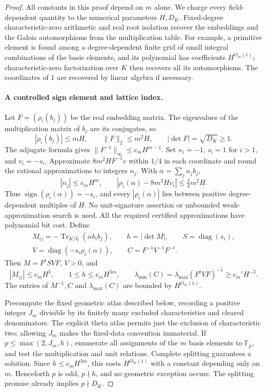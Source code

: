 \documentclass[11pt]{article}
\theoremstyle{definition}
\theoremstyle{remark}
\begin{document}
\begin{proof}

All constants in this proof depend on $m$ alone.  We charge every
field-dependent quantity to the numerical parameters $H,D_K$.  Fixed-degree
characteristic-zero arithmetic and real root isolation recover the embeddings
and the Galois automorphisms from the multiplication table.  For example,
a primitive element is found among a degree-dependent finite grid of small
integral combinations of the basis elements, and its polynomial has
coefficients $H^{O_m(1)}$; characteristic-zero factorization over $K$ then
recovers all its automorphisms.  The coordinates of $1$ are recovered by
linear algebra if necessary.

\paragraph{A controlled sign element and lattice index.}
Let $F=(\rho_i(b_j))$ be the real embedding matrix.  The eigenvalues of the
multiplication matrix of $b_j$ are its conjugates, so
\[
 |\rho_i(b_j)|\leq mH,\qquad \|F\|_2\leq m^2H,
 \qquad |\det F|=\sqrt{D_K}\geq1.
\]
The adjugate formula gives $\|F^{-1}\|_\infty\leq c_mH^{m-1}$.
Set $s_1=-1$, $s_i=1$ for $i>1$, and $v_i=-s_i$.
Approximate $8m^2HF^{-1}v$ within $1/4$ in each coordinate and round the
rational approximations to integers $n_j$.  With $\alpha=\sum_jn_jb_j$,
\[
 |n_j|\leq c_mH^m,\qquad
 |\rho_i(\alpha)-8m^2Hv_i|\leq\tfrac34m^2H.
\]
Thus $\operatorname{sign}(\rho_i(\alpha))=-s_i$, and every
$|\rho_i(\alpha)|$ lies between positive degree-dependent multiples of $H$.
No unit-signature assertion or unbounded weak-approximation search is used.
All the required certified approximations have polynomial bit cost.
Define
\[
 \begin{gathered}
 M_{ij}=-\operatorname{Tr}_{K/\mathbb Q}(\alpha b_ib_j),\qquad
 h=|\det M|,\qquad S=\operatorname{diag}(s_i),\\
 V=\operatorname{diag}(-s_i\rho_i(\alpha)),\qquad
 C=F^{-1}V^{-1}F^{-t}.
 \end{gathered}
\]
Then $M=F^tSVF$, $V>0$, and
\[
 |M_{ij}|\leq c_mH^3,\qquad
 1\leq h\leq c_mH^{3m},\qquad
 \lambda_{\min}(C)
  =\lambda_{\max}(F^tVF)^{-1}\geq c_m'H^{-3}.
\]
The entries of $M^{-1},C$ and $\lambda_{\max}(C)$ are bounded by
$H^{O_m(1)}$.

Precompute the fixed geometric atlas described below, recording a positive
integer $J_m$ divisible by its finitely many excluded characteristics and
cleared denominators.  The explicit theta atlas permits just the exclusion
of characteristic two; allowing $J_m$ makes the fixed-data convention
immaterial.  If $p\leq\max(2,J_m,h)$, enumerate all assignments of the $m$
basis elements to $\mathbb F_p$, and test the multiplication and unit
relations.  Complete splitting guarantees a solution.  Since
$h\leq c_mH^{3m}$, this costs $H^{O_m(1)}$ with a constant depending only on
$m$.  Henceforth $p$ is odd, $p\nmid h$, and no geometric exception occurs.
The splitting promise already implies $p\nmid D_K$.


\end{proof}
\end{document}
